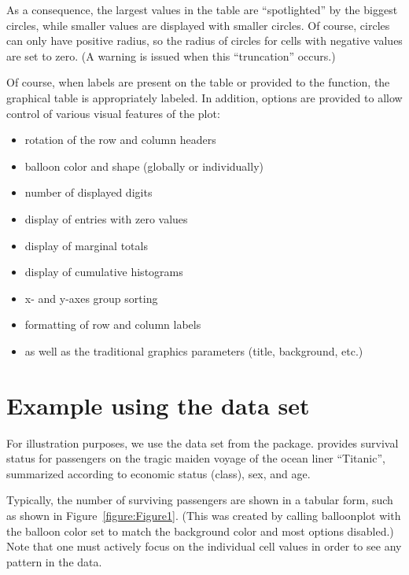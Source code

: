 \documentclass[a4paper]{report}
\begin{document}
\begin{article}
As a consequence, the largest values in the table are
``spotlighted'' by the biggest circles, while smaller values are
displayed with smaller circles.  Of course, circles can only have
positive radius, so the radius of circles for cells with negative
values are set to zero.  (A warning is issued when this
``truncation'' occurs.)

Of course, when labels are present on the table or provided to the
function, the graphical table is appropriately labeled.  In
addition, options are provided to allow control of various visual features
of the plot:

\begin{itemize}
  \item rotation of the row and column headers
  \item balloon color and shape (globally or individually)
  \item number of displayed digits
  \item display of entries with zero values
  \item display of marginal totals
  \item display of cumulative histograms
  \item x- and y-axes group sorting
  \item formatting of row and column labels
  \item as well as the traditional graphics parameters (title,
    background, etc.)
\end{itemize}

\section*{Example using the  data set}

For illustration purposes, we use the  data set from
the  package.   provides survival status
for passengers on the tragic maiden voyage of the ocean liner
``Titanic'', summarized according to economic status (class), sex, and
age.

Typically, the number of surviving passengers are shown in a tabular
form, such as shown in Figure~\ref{figure:Figure1}.  (This was created
by calling balloonplot with the balloon color set to match the
background color and most options disabled.)  Note that one must
actively focus on the individual cell values in order to see any
pattern in the data.


\end{article}
\end{document}
